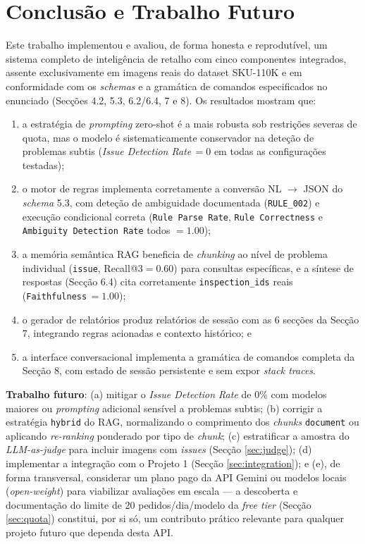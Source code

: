 \documentclass[conference]{IEEEtran}
\begin{document}
\section{Conclusão e Trabalho Futuro}
\label{sec:future}

Este trabalho implementou e avaliou, de forma honesta e reprodutível, um
sistema completo de inteligência de retalho com cinco componentes
integrados, assente exclusivamente em imagens reais do dataset SKU-110K e em
conformidade com os \textit{schemas} e a gramática de comandos especificados
no enunciado (Secções 4.2, 5.3, 6.2/6.4, 7 e 8). Os resultados mostram que:

\begin{enumerate}
  \item a estratégia de \textit{prompting} zero-shot é a mais robusta sob
  restrições severas de quota, mas o modelo é sistematicamente conservador
  na deteção de problemas subtis (\textit{Issue Detection Rate}\,$=0$ em
  todas as configurações testadas);
  \item o motor de regras implementa corretamente a conversão NL
  $\rightarrow$ JSON do \textit{schema} 5.3, com deteção de ambiguidade
  documentada (\texttt{RULE\_002}) e execução condicional correta
  (\texttt{Rule Parse Rate}, \texttt{Rule Correctness} e \texttt{Ambiguity
  Detection Rate} todos $=1.00$);
  \item a memória semântica RAG beneficia de \textit{chunking} ao nível de
  problema individual (\texttt{issue}, Recall@3$=0.60$) para consultas
  específicas, e a síntese de respostas (Secção 6.4) cita corretamente
  \texttt{inspection\_ids} reais (\texttt{Faithfulness}\,$=1.00$);
  \item o gerador de relatórios produz relatórios de sessão com as 6
  secções da Secção 7, integrando regras acionadas e contexto histórico; e
  \item a interface conversacional implementa a gramática de comandos
  completa da Secção 8, com estado de sessão persistente e sem expor
  \textit{stack traces}.
\end{enumerate}

\textbf{Trabalho futuro}: (a) mitigar o \textit{Issue Detection Rate} de 0\%
com modelos maiores ou \textit{prompting} adicional sensível a problemas
subtis; (b) corrigir a estratégia \texttt{hybrid} do RAG, normalizando o
comprimento dos \textit{chunks} \texttt{document} ou aplicando
\textit{re-ranking} ponderado por tipo de \textit{chunk}; (c) estratificar a
amostra do \textit{LLM-as-judge} para incluir imagens com \textit{issues}
(Secção \ref{sec:judge}); (d) implementar a integração com o Projeto 1
(Secção \ref{sec:integration}); e (e), de forma transversal, considerar um
plano pago da API Gemini ou modelos locais (\textit{open-weight}) para
viabilizar avaliações em escala --- a descoberta e documentação do limite de
20 pedidos/dia/modelo da \textit{free tier} (Secção \ref{sec:quota})
constitui, por si só, um contributo prático relevante para qualquer projeto
futuro que dependa desta API.
\end{document}
